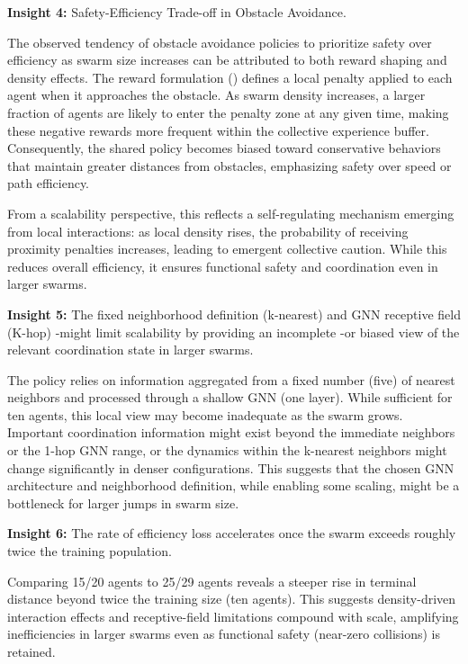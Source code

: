 \begin{tcolorbox}[colback=insightgray, colframe=black!20!white, boxrule=0.5pt, arc=1mm, boxsep=1pt, left=2pt, right=2pt, top=2pt, bottom=2pt]
 \textbf{Insight 4:} Safety-Efficiency Trade-off in Obstacle Avoidance.
\end{tcolorbox}
The observed tendency of obstacle avoidance policies to prioritize safety over efficiency 
 as swarm size increases can be attributed to both reward shaping and density effects. 
% 
The reward formulation () defines a local penalty applied to each agent 
 when it approaches the obstacle. 
% 
As swarm density increases,
 a larger fraction of agents are likely to enter the penalty zone at any given time, 
 making these negative rewards more frequent within the collective experience buffer. 
% 
Consequently, 
 the shared policy becomes biased toward conservative behaviors that maintain greater distances from obstacles,
 emphasizing safety over speed or path efficiency.

From a scalability perspective, 
 this reflects a self-regulating mechanism emerging from local interactions: 
 as local density rises, the probability of receiving proximity penalties increases, 
 leading to emergent collective caution. 
% 
While this reduces overall efficiency, 
 it ensures functional safety and coordination even in larger swarms.


\begin{tcolorbox}[colback=insightgray, colframe=black!20!white, boxrule=0.5pt, arc=1mm, boxsep=1pt, left=2pt, right=2pt, top=2pt, bottom=2pt]
	\textbf{Insight 5:} The fixed neighborhood definition (k-nearest) and GNN receptive field (K-hop) 
-might limit scalability by providing an incomplete 
-or biased view of the relevant coordination state in larger swarms.
\end{tcolorbox}
The policy relies on information aggregated from a fixed number (five) 
of nearest neighbors and processed through a shallow GNN (one layer). 
%
While sufficient for ten agents, 
 this local view may become inadequate as the swarm grows. 
%
Important coordination information might exist beyond the immediate neighbors or the 1-hop GNN range, 
 or the dynamics within the k-nearest neighbors might change significantly in denser configurations. 
%
This suggests that the chosen GNN architecture and neighborhood definition, 
 while enabling some scaling, 
 might be a bottleneck for larger jumps in swarm size.

\begin{tcolorbox}[colback=insightgray, colframe=black!20!white, boxrule=0.5pt, arc=1mm, boxsep=1pt, left=2pt, right=2pt, top=2pt, bottom=2pt]
	\textbf{Insight 6:} The rate of efficiency loss accelerates once the swarm exceeds roughly twice the training population.
\end{tcolorbox}
Comparing 15/20 agents to 25/29 agents reveals a steeper rise in terminal distance 
 beyond twice the training size (ten agents). 
%
This suggests density-driven interaction effects and receptive-field limitations compound with scale, 
 amplifying inefficiencies in larger swarms even as functional safety (near-zero collisions) is retained.

